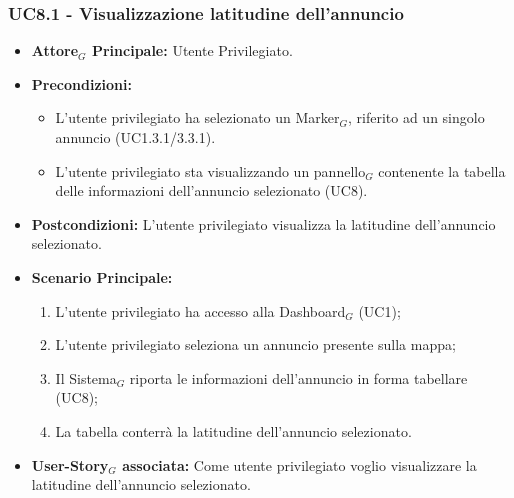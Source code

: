 \documentclass[10pt]{article}
\begin{document}
\begin{justify}
 \subsubsection{\textbf{UC8.1 - Visualizzazione latitudine dell'annuncio}}
 \begin{itemize}
     \item \textbf{Attore$_G$ Principale:} Utente Privilegiato.
     \item \textbf{Precondizioni:}
       \begin{itemize}
    	        \item L'utente privilegiato ha selezionato un Marker$_G$, riferito ad un singolo annuncio (UC1.3.1/3.3.1).
          \item L'utente privilegiato sta visualizzando un pannello$_G$ contenente la tabella delle informazioni dell'annuncio selezionato (UC8).
       \end{itemize}
     \item \textbf{Postcondizioni:} L'utente privilegiato visualizza la latitudine dell'annuncio selezionato.
     \item \textbf{Scenario Principale:}
        \begin{enumerate}
            \item L'utente privilegiato ha accesso alla Dashboard$_G$ (UC1);
            \item L'utente privilegiato seleziona un annuncio presente sulla mappa;
            \item Il Sistema$_G$ riporta le informazioni dell'annuncio in forma tabellare (UC8);
            \item La tabella conterrà la latitudine dell'annuncio selezionato.
        \end{enumerate}
     \item \textbf{User-Story$_G$ associata:} Come utente privilegiato voglio visualizzare la latitudine dell'annuncio selezionato. 
 \end{itemize}

\end{justify}
\end{document}
